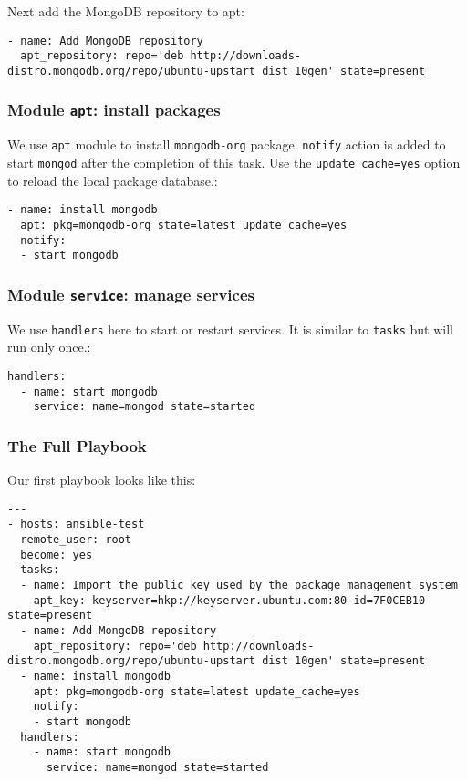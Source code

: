 Next add the MongoDB repository to apt:

\begin{verbatim}
- name: Add MongoDB repository
  apt_repository: repo='deb http://downloads-distro.mongodb.org/repo/ubuntu-upstart dist 10gen' state=present
\end{verbatim}

\subsubsection{\texorpdfstring{Module \texttt{apt}: install
packages}{Module apt: install packages}}\label{module-apt-install-packages}

We use \texttt{apt} module to install \texttt{mongodb-org} package.
\texttt{notify} action is added to start \texttt{mongod} after the
completion of this task. Use the \texttt{update\_cache=yes} option to
reload the local package database.:

\begin{verbatim}
- name: install mongodb
  apt: pkg=mongodb-org state=latest update_cache=yes
  notify:
  - start mongodb
\end{verbatim}

\subsubsection{\texorpdfstring{Module \texttt{service}: manage
services}{Module service: manage services}}\label{module-service-manage-services}

We use \texttt{handlers} here to start or restart services. It is
similar to \texttt{tasks} but will run only once.:

\begin{verbatim}
handlers:
  - name: start mongodb
    service: name=mongod state=started
\end{verbatim}

\subsubsection{The Full Playbook}\label{the-full-playbook}

Our first playbook looks like this:

\begin{verbatim}
---
- hosts: ansible-test
  remote_user: root
  become: yes
  tasks:
  - name: Import the public key used by the package management system
    apt_key: keyserver=hkp://keyserver.ubuntu.com:80 id=7F0CEB10 state=present
  - name: Add MongoDB repository
    apt_repository: repo='deb http://downloads-distro.mongodb.org/repo/ubuntu-upstart dist 10gen' state=present
  - name: install mongodb
    apt: pkg=mongodb-org state=latest update_cache=yes
    notify:
    - start mongodb
  handlers:
    - name: start mongodb
      service: name=mongod state=started
\end{verbatim}

